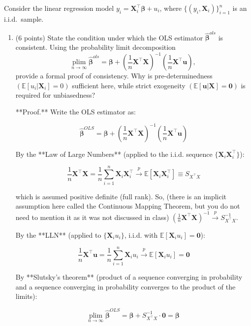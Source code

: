 \documentclass[letterpaper,12pt]{article}
\begin{document}
Consider the linear regression model $y_i = \mathbf{X}_i^\top \boldsymbol{\beta} + u_i$, where $\{(y_i, \mathbf{X}_i)\}_{i=1}^n$ is an i.i.d.\ sample.

\begin{enumerate}[label=(\alph*)]

\item (6 points) State the condition under which the OLS estimator $\hat{\boldsymbol{\beta}}^{ols}$ is consistent. Using the probability limit decomposition
\[
\underset{n\to\infty}{\mathrm{plim}}\;\hat{\boldsymbol{\beta}}^{ols}
= \boldsymbol{\beta}
+ \left(\frac{1}{n}\mathbf{X}^\top\mathbf{X}\right)^{-1}
  \left(\frac{1}{n}\mathbf{X}^\top\mathbf{u}\right),
\]
provide a formal proof of consistency. Why is pre-determinedness $\left(\mathbb{E}[u_i|\mathbf{X}_i]=0\right)$ sufficient here, while strict exogeneity $\left(\mathbb{E}[\mathbf{u}|\mathbf{X}]=\mathbf{0}\right)$ is required for unbiasedness?

**Proof.** Write the OLS estimator as:

$$\hat{\boldsymbol{\beta}}^{OLS} = \boldsymbol{\beta} + \left(\frac{1}{n}\mathbf{X}^\top\mathbf{X}\right)^{-1}\left(\frac{1}{n}\mathbf{X}^\top\mathbf{u}\right)$$

By the **Law of Large Numbers** (applied to the i.i.d. sequence $\{\mathbf{X}_i\mathbf{X}_i^\top\}$):

$$\frac{1}{n}\mathbf{X}^\top\mathbf{X} = \frac{1}{n}\sum_{i=1}^n \mathbf{X}_i\mathbf{X}_i^\top \xrightarrow{p} \mathbb{E}[\mathbf{X}_i\mathbf{X}_i^\top] \equiv S_{X^\top X}$$

which is assumed positive definite (full rank). So, (there is an implicit assumption here called the Continuous Mapping Theorem, but you do not need to mention it as it was not discussed in class) $\left(\frac{1}{n}\mathbf{X}^\top\mathbf{X}\right)^{-1} \xrightarrow{p} S_{X^\top X}^{-1}$.

By the **LLN** (applied to $\{\mathbf{X}_i u_i\}$, i.i.d. with $\mathbb{E}[\mathbf{X}_i u_i] = \mathbf{0}$):

$$\frac{1}{n}\mathbf{X}^\top\mathbf{u} = \frac{1}{n}\sum_{i=1}^n \mathbf{X}_i u_i \xrightarrow{p} \mathbb{E}[\mathbf{X}_i u_i] = \mathbf{0}$$

By **Slutsky's theorem** (product of a sequence converging in probability and a sequence converging in probability converges to the product of the limits):

$$\underset{n\to\infty}{\mathrm{plim}}\;\hat{\boldsymbol{\beta}}^{OLS} = \boldsymbol{\beta} + S_{X^\top X}^{-1} \cdot \mathbf{0} = \boldsymbol{\beta} $$


\end{enumerate}
\end{document}
